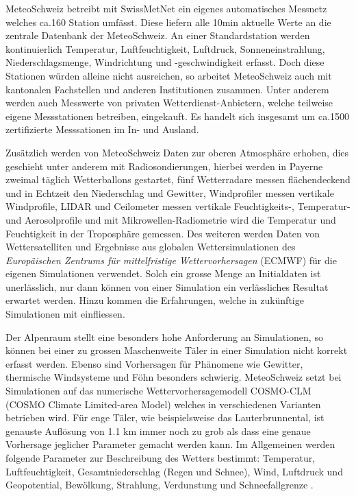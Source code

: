 \begin{refsection}
MeteoSchweiz betreibt mit SwissMetNet ein eigenes automatisches Messnetz welches ca.160 Station umfässt. Diese liefern alle 10min aktuelle Werte an die zentrale Datenbank der MeteoSchweiz. An einer Standardstation werden kontinuierlich Temperatur, Luftfeuchtigkeit, Luftdruck, Sonneneinstrahlung, Niederschlagsmenge, Windrichtung und -geschwindigkeit erfasst. Doch diese Stationen würden alleine nicht ausreichen, so arbeitet MeteoSchweiz auch mit kantonalen Fachstellen und anderen Institutionen zusammen. Unter anderem werden auch Messwerte von privaten Wetterdienst-Anbietern, welche teilweise eigene Messstationen betreiben, eingekauft. Es handelt sich insgesamt um ca.1500 zertifizierte Messsationen im In- und Ausland.

Zusätzlich werden von MeteoSchweiz Daten zur oberen Atmosphäre erhoben, dies geschieht unter anderem mit Radiosondierungen, hierbei werden in Payerne zweimal täglich Wetterballons gestartet, fünf Wetterradare messen flächendeckend und in Echtzeit den Niederschlag und Gewitter, Windprofiler messen vertikale Windprofile, LIDAR und Ceilometer messen vertikale Feuchtigkeits-, Temperatur- und Aerosolprofile und mit Mikrowellen-Radiometrie wird die  Temperatur und Feuchtigkeit in der Troposphäre gemessen. Des weiteren werden Daten von Wettersatelliten und Ergebnisse aus globalen Wettersimulationen des {\em Europäischen Zentrums für mittelfristige Wettervorhersagen} (ECMWF) für die eigenen Simulationen verwendet. Solch ein grosse Menge an Initialdaten ist unerlässlich, nur dann können von einer Simulation ein verlässliches Resultat erwartet werden. Hinzu kommen die Erfahrungen, welche in zukünftige Simulationen mit einfliessen.

Der Alpenraum stellt eine besonders hohe Anforderung an Simulationen, so können bei einer zu grossen Maschenweite Täler in einer Simulation nicht korrekt erfasst werden. Ebenso sind Vorhersagen  für Phänomene wie Gewitter, thermische Windsysteme und Föhn besonders schwierig. MeteoSchweiz setzt bei Simulationen auf das numerische Wettervorhersagemodell COSMO-CLM (COSMO Climate Limited-area Model) welches in verschiedenen Varianten betrieben wird. Für enge Täler, wie beispielsweise das Lauterbrunnental, ist genauste Auflösung von 1.1 km immer noch zu grob als dass eine genaue Vorhersage jeglicher Parameter gemacht werden kann.
Im Allgemeinen werden folgende Parameter zur Beschreibung des Wetters bestimmt: Temperatur, Luftfeuchtigkeit, Gesamtniederschlag (Regen und Schnee), Wind, Luftdruck und Geopotential, Bewölkung, Strahlung, Verdunstung und Schneefallgrenze \cite{klima:meteoschweiz} \cite{klima:tagi1} \cite{klima:tagi2}.


\end{refsection}
